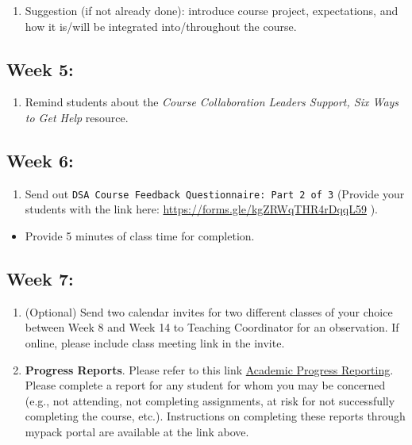 \documentclass[
]{book}
\providecommand{\tightlist}{%
  \setlength{\itemsep}{0pt}\setlength{\parskip}{0pt}}
\begin{document}
\begin{enumerate}
\def\labelenumi{\arabic{enumi})}
\tightlist
\item
  Suggestion (if not already done): introduce course project, expectations, and how it is/will be integrated into/throughout the course.
\end{enumerate}

\hypertarget{week-5}{%
\subsection{Week 5:}\label{week-5}}

\begin{enumerate}
\def\labelenumi{\arabic{enumi})}
\tightlist
\item
  Remind students about the \emph{Course Collaboration Leaders Support, Six Ways to Get Help} resource.
\end{enumerate}

\hypertarget{week-6}{%
\subsection{Week 6:}\label{week-6}}

\begin{enumerate}
\def\labelenumi{\arabic{enumi})}
\tightlist
\item
  Send out \texttt{DSA\ Course\ Feedback\ Questionnaire:\ Part\ 2\ of\ 3} (Provide your students with the link here: \url{https://forms.gle/kgZRWqTHR4rDqqL59} ).
\end{enumerate}

\begin{itemize}
\tightlist
\item
  Provide 5 minutes of class time for completion.
\end{itemize}

\hypertarget{week-7}{%
\subsection{Week 7:}\label{week-7}}

\begin{enumerate}
\def\labelenumi{\arabic{enumi})}
\item
  (Optional) Send two calendar invites for two different classes of your choice between Week 8 and Week 14 to Teaching Coordinator for an observation. If online, please include class meeting link in the invite.
\item
  \textbf{Progress Reports}. Please refer to this link \href{https://dasa.ncsu.edu/faculty-resources/academic-progress-reporting/}{Academic Progress Reporting}. Please complete a report for any student for whom you may be concerned (e.g., not attending, not completing assignments, at risk for not successfully completing the course, etc.). Instructions on completing these reports through mypack portal are available at the link above.
\end{enumerate}
\end{document}
